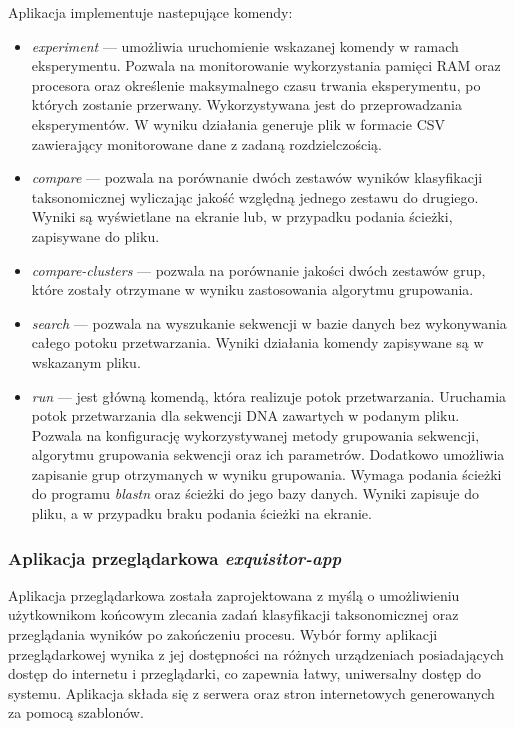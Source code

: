             Aplikacja implementuje nastepujące komendy:
            \begin{itemize}
                \item {
                    \textit{experiment} --- umożliwia uruchomienie wskazanej komendy w ramach eksperymentu. Pozwala na monitorowanie wykorzystania pamięci RAM oraz procesora oraz określenie maksymalnego czasu trwania eksperymentu, po których zostanie przerwany. Wykorzystywana jest do przeprowadzania eksperymentów. W wyniku działania generuje plik w formacie CSV zawierający monitorowane dane z zadaną rozdzielczością.
                }
                \item {
                    \textit{compare} --- pozwala na porównanie dwóch zestawów wyników klasyfikacji taksonomicznej wyliczając jakość względną jednego zestawu do drugiego. Wyniki są wyświetlane na ekranie lub, w przypadku podania ścieżki, zapisywane do pliku.
                }
                \item {
                    \textit{compare-clusters} --- pozwala na porównanie jakości dwóch zestawów grup, które zostały otrzymane w wyniku zastosowania algorytmu grupowania.
                }
                \item {
                    \textit{search} --- pozwala na wyszukanie sekwencji w bazie danych bez wykonywania całego potoku przetwarzania. Wyniki działania komendy zapisywane są w wskazanym pliku.
                }
                \item {
                    \textit{run} --- jest główną komendą, która realizuje potok przetwarzania. Uruchamia potok przetwarzania dla sekwencji DNA zawartych w podanym pliku. Pozwala na konfigurację wykorzystywanej metody grupowania sekwencji, algorytmu grupowania sekwencji oraz ich parametrów. Dodatkowo umożliwia zapisanie grup otrzymanych w wyniku grupowania. Wymaga podania ścieżki do programu \textit{blastn} oraz ścieżki do jego bazy danych. Wyniki zapisuje do pliku, a w przypadku braku podania ścieżki na ekranie.
                }
            \end{itemize}

        \subsubsection{Aplikacja przeglądarkowa \textit{exquisitor-app}}
            Aplikacja przeglądarkowa została zaprojektowana z myślą o umożliwieniu użytkownikom końcowym zlecania zadań klasyfikacji taksonomicznej oraz przeglądania wyników po zakończeniu procesu. Wybór formy aplikacji przeglądarkowej wynika z jej dostępności na różnych urządzeniach posiadających dostęp do internetu i przeglądarki, co zapewnia łatwy, uniwersalny dostęp do systemu. Aplikacja składa się z serwera oraz stron internetowych generowanych za pomocą szablonów.

